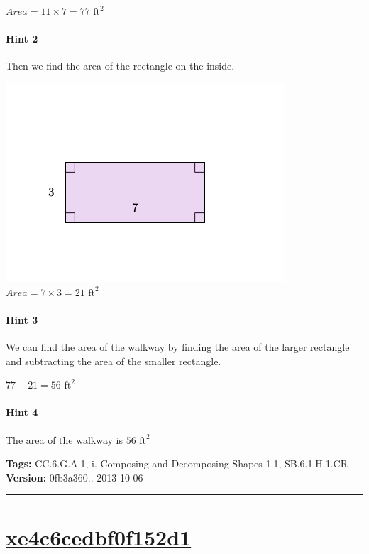 \documentclass[twocolumn,10pt]{article}
\def\shrinkfactor{0.55}
\begin{document}
$Area=11\times7=77  \text{ ft}^2$  

\paragraph{Hint 2}Then we find the area of the rectangle on the inside.  

\includegraphics[scale=\shrinkfactor]{figures/4556df22afd646e1d6a1194fb2a02274fb9fadbb.png}  
$Area=7\times3=21  \text{ ft}^2$  

\paragraph{Hint 3}We can find the area of the walkway by finding the area of the larger rectangle and subtracting the area of the smaller rectangle. 

$77-21=56\text{ ft}^2$ 

\paragraph{Hint 4}The area of the walkway is $56\text{ ft}^2$ 



\medskip
\noindent
\textbf{Tags:} {\footnotesize CC.6.G.A.1, i.	Composing and Decomposing Shapes 1.1, SB.6.1.H.1.CR}\\
\textbf{Version:} 0fb3a360.. 2013-10-06
\smallskip\hrule





\section{\href{https://www.khanacademy.org/devadmin/content/items/xe4c6cedbf0f152d1}{xe4c6cedbf0f152d1}}
\end{document}
